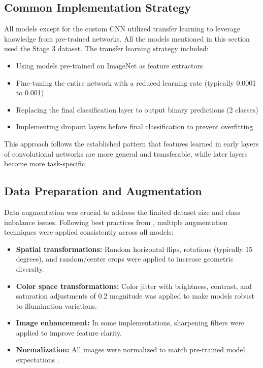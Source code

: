 \documentclass[a4paper,12pt]{report}
\begin{document}
\subsection{Common Implementation Strategy}

All models except for the custom CNN utilized transfer learning to leverage knowledge from pre-trained networks. All the models mentioned in this section used the Stage 3 dataset. The transfer learning strategy included:

\begin{itemize}
    \item Using models pre-trained on ImageNet as feature extractors
    \item Fine-tuning the entire network with a reduced learning rate (typically 0.0001 to 0.001)
    \item Replacing the final classification layer to output binary predictions (2 classes)
    \item Implementing dropout layers before final classification to prevent overfitting
\end{itemize}

This approach follows the established pattern that features learned in early layers of convolutional networks are more general and transferable, while later layers become more task-specific.

\subsection{Data Preparation and Augmentation}

Data augmentation was crucial to address the limited dataset size and class imbalance issues. Following best practices from \citep{perez2017effectivenessdataaugmentationimage}, multiple augmentation techniques were applied consistently across all models:

\begin{itemize}
    \item \textbf{Spatial transformations:} Random horizontal flips, rotations (typically 15 degrees), and random/center crops were applied to increase geometric diversity.
    \item \textbf{Color space transformations:} Color jitter with brightness, contrast, and saturation adjustments of 0.2 magnitude was applied to make models robust to illumination variations.
    \item \textbf{Image enhancement:} In some implementations, sharpening filters were applied to improve feature clarity.
    \item \textbf{Normalization:} All images were normalized to match pre-trained model expectations \citep{wu2018groupnormalization}.
\end{itemize}
\end{document}

